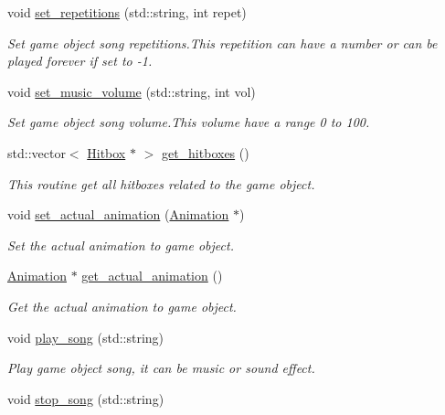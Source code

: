 \begin{DoxyCompactItemize}
void \hyperlink{classengine_1_1_game_object_ab00ac1e7a2d01677797680a1d81681f0}{set\+\_\+repetitions} (std\+::string, int repet)
\begin{DoxyCompactList}\small\item\em Set game object song repetitions.\+This repetition can have a number or can be played forever if set to -\/1. \end{DoxyCompactList}\item 
void \hyperlink{classengine_1_1_game_object_a41ac469cb05369b5c25cbbf60df6638d}{set\+\_\+music\+\_\+volume} (std\+::string, int vol)
\begin{DoxyCompactList}\small\item\em Set game object song volume.\+This volume have a range 0 to 100. \end{DoxyCompactList}\item 
std\+::vector$<$ \hyperlink{classengine_1_1_hitbox}{Hitbox} $\ast$ $>$ \hyperlink{classengine_1_1_game_object_aea5d44c3ed89d21e808a95287a933612}{get\+\_\+hitboxes} ()
\begin{DoxyCompactList}\small\item\em This routine get all hitboxes related to the game object. \end{DoxyCompactList}\item 
void \hyperlink{classengine_1_1_game_object_a281a58cba74b80155bc8d54f727f5c2f}{set\+\_\+actual\+\_\+animation} (\hyperlink{classengine_1_1_animation}{Animation} $\ast$)
\begin{DoxyCompactList}\small\item\em Set the actual animation to game object. \end{DoxyCompactList}\item 
\hyperlink{classengine_1_1_animation}{Animation} $\ast$ \hyperlink{classengine_1_1_game_object_ae2136ffcfe9a9e0d44ca20890cbfd77e}{get\+\_\+actual\+\_\+animation} ()
\begin{DoxyCompactList}\small\item\em Get the actual animation to game object. \end{DoxyCompactList}\item 
void \hyperlink{classengine_1_1_game_object_a1f41bb02b31ce7f828bc8ef4963d3aed}{play\+\_\+song} (std\+::string)
\begin{DoxyCompactList}\small\item\em Play game object song, it can be music or sound effect. \end{DoxyCompactList}\item 
void \hyperlink{classengine_1_1_game_object_a162ddcb22b60dd7d6c3c6108751fd835}{stop\+\_\+song} (std\+::string)

\end{DoxyCompactItemize}
